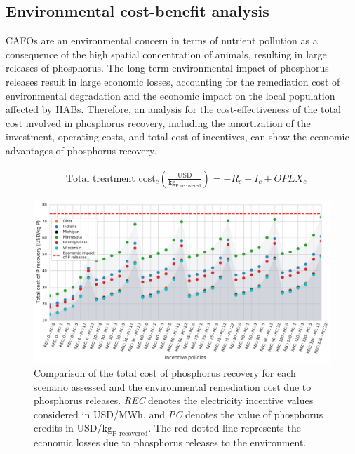 \begin{refsection}[referencesCh5]
\subsection{Environmental cost-benefit analysis}
CAFOs are an environmental concern in terms of nutrient pollution as a consequence of the high spatial concentration of animals, resulting in large releases of phosphorus. 
The long-term environmental impact of phosphorus releases result in large economic losses, accounting for the remediation cost of environmental degradation and the economic impact on the local population affected by HABs. Therefore, an analysis for the cost-effectiveness of the total cost involved in phosphorus recovery, including the amortization of the investment, operating costs, and total cost of incentives, can show the economic advantages of phosphorus recovery. 

\begin{align}
& \text{Total treatment cost}_{c} \left(\frac{\text{USD}}{\text{kg}_{\text{P recovered}}}\right) = -R_{c} + I_{c} + OPEX_{c} \label{eq:TotTreatCost}
\end{align}

\begin{figure}[h!]
	\centering
	\includegraphics[width=\linewidth]{gfx/Chapter5/TotalCost_kgPRecoveredAllStatesv2Clean.pdf} 
	
	\caption{Comparison of the total cost of phosphorus recovery for each scenario assessed and the environmental remediation cost due to phosphorus releases. \textit{REC} denotes the electricity incentive values considered in USD/MWh, and \textit{PC} denotes the value of phosphorus credits in USD/${\text{kg}_\text{P recovered}}$. The red dotted line represents the economic losses due to phosphorus releases to the environment.}
	\label{fig:plot_scenarios}
\end{figure}


\end{refsection}
